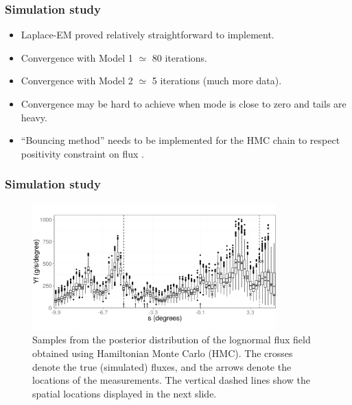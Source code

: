 \documentclass{beamer}
\begin{document}
\begin{frame}
\frametitle{Simulation study}

\begin{itemize}
\item Laplace-EM proved relatively straightforward to implement.
\item Convergence with Model 1 $\simeq$ 80 iterations.
\item Convergence with Model 2 $\simeq$ 5 iterations (much more data).
\item Convergence may be hard to achieve when mode is close to zero and tails are heavy.
\item ``Bouncing method'' needs to be implemented for the HMC chain to respect positivity constraint on flux \citep{Neal_2011}.
\end{itemize}
\end{frame}


\begin{frame}
\frametitle{Simulation study}

\begin{figure}
\includegraphics[width=3.7in]{Sim1_samples.png}
\caption{Samples from the posterior distribution of the lognormal flux field obtained using Hamiltonian Monte Carlo (HMC). The crosses denote the true (simulated) fluxes, and the arrows denote the locations of the measurements. The vertical dashed lines show the spatial locations displayed in the next slide.}
\end{figure}
\end{frame}
\end{document}
